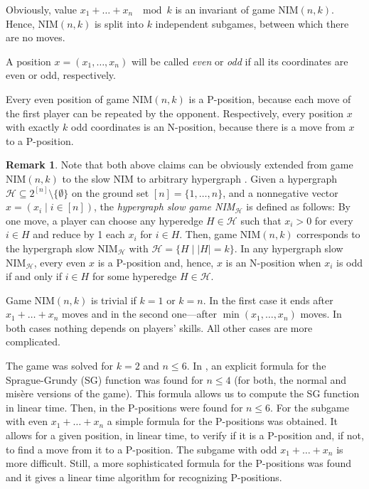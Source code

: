 \documentclass{article}
\theoremstyle{definition}
\newtheorem{remark}{Remark}
\def\cH{\mathcal{H}}
\begin{document}
\smallskip

Obviously, value    
$x_1 + \dots + x_n \; \mod k$  
is an invariant of game NIM$(n,k)$.  
Hence, NIM$(n,k)$  is split into  
$k$  independent subgames, 
between which there are no moves. 

\smallskip

A position $x = (x_1, \dots, x_n)$
will be called {\em even} or {\em odd}  
if all its coordinates are even or odd, respectively. 

\medskip 

Every even position of 
game NIM$(n,k)$  is a P-position, 
because each move of the first player 
can be repeated by the opponent. 
Respectively, every position  $x$  
with exactly  $k$  odd coordinates 
is an N-position, because there is a move from  $x$ 
to a P-position. 

\begin{remark} 
Note that both above claims 
can be obviously extended from game NIM$(n,k)$  
to the slow NIM to arbitrary hypergraph \cite{GH15}. 
Given a hypergraph  
$\cH \subseteq 2^{[n]} \setminus \{\emptyset\}$ 
on the ground set $[n] = \{1, \dots, n\}$,
and a nonnegative vector  $x = (x_i \mid i \in [n])$, 
the {\em hypergraph slow game NIM$_\cH$}  
is defined as follows: 
By one move, a player can choose any hyperedge 
$H \in \cH$ such that  $x_i > 0$  for every $i \in H$ 
and reduce by 1  each $x_i$  for  $i \in H$.  
Then, game NIM$(n,k)$  corresponds to 
the hypergraph slow NIM$_{\cH}$   
with   $\cH = \{H \mid |H| = k\}$. 
In any  hypergraph slow NIM$_{\cH}$,  every even $x$  is a P-position 
and, hence,  $x$  is an N-position when  
$x_i$  is odd if and only if  $i \in H$
for some hyperedge $H \in \cH$.
\end{remark} 

Game NIM$(n,k)$  is trivial if  $k = 1$  or  $k = n$. 
In the first case it ends after $x_1 + \dots + x_n$ moves  
and in the second one---after  $\min(x_1, \dots, x_n)$ 
moves. In both cases nothing depends on players' skills. 
All other cases are more complicated. 

The game was solved for  $k=2$  and  $n \leq 6$.
In \cite{GHHC20}, an explicit formula 
for the Sprague-Grundy 
(SG) function was found for  $n \leq 4$
(for both, the normal and mis\`ere versions of the game). 
This formula allows us to compute  the SG function in linear time. 
Then, in \cite{CGKPV21} the P-positions were found for  $n \leq 6$.  
For the subgame with even  $x_1 + \dots + x_n$ 
a simple formula for the P-positions was obtained. 
It allows for a given position, in linear time,  
to verify if it is a P-position and, if not, 
to find a move from it to a P-position.  
The subgame with odd  $x_1 + \dots + x_n$ is  more difficult. 
Still, a more sophisticated  formula for the P-positions was found and it gives a linear time algorithm for recognizing P-positions. 
\end{document}
